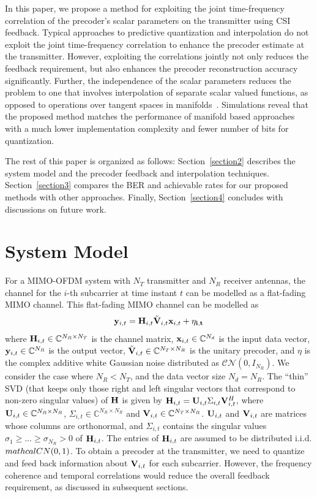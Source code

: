 \documentclass[journal,10pt,twocolumn]{IEEEtran}
\def\bx{{\bf x}}
\def\by{{\bf y}}
\def\bH{{\bf H}}
\def\bU{{\bf U}}
\def\bV{{\bf V}}
\begin{document}
In this paper, we propose a method for exploiting the joint
time-frequency correlation of the precoder's scalar parameters on the
transmitter using CSI feedback. Typical approaches to predictive
quantization and interpolation do not exploit the joint time-frequency
correlation to enhance the precoder estimate at the
transmitter. However, exploiting the correlations jointly not only
reduces the feedback requirement, but also enhances the precoder
reconstruction accuracy significantly. Further, the independence of
the scalar parameters reduces the problem to one that involves
interpolation of separate scalar valued functions, as opposed to
operations over tangent spaces in
manifolds~\cite{Gupt1905:Predictive}. Simulations reveal that the
proposed method matches the performance of manifold based approaches
with a much lower implementation complexity and fewer number of bits
for quantization.

The rest of this paper is organized as follows: Section~\ref{section2}
describes the system model and the precoder feedback and interpolation
techniques. Section~\ref{section3} compares the BER and achievable
rates for our proposed methods with other approaches. Finally,
Section~\ref{section4} concludes with discussions on future work.

\section{System Model}
For a MIMO-OFDM system with $N_T$ transmitter and $N_R$ receiver
antennas, the channel for the $i$-th subcarrier at time instant $t$
can be modelled as a flat-fading MIMO channel. This flat-fading MIMO
channel can be modelled as
\label{section2}
\begin{equation}
\by_{i,t} = \bH_{i,t}\tilde{\bV}_{i,t} \bx_{i,t}+ \bf{\eta_{i,t}}
\end{equation}
where $\bH_{i,t} \in \mathbb{C}^{N_R \times N_T}$ is the channel
matrix, $\bx_{i,t} \in \mathbb{C}^{N_d}$ is the input data vector,
$\by_{i,t} \in \mathbb{C}^{N_R}$ is the output vector,
$\tilde{\bV}_{i,t} \in \mathbb{C}^{N_T \times N_R}$ is the unitary
precoder, and $\eta$ is the complex additive white Gaussian noise
distributed as ${\mathcal{CN}}(0,I_{N_R})$. We consider the case where
$N_R < N_T$, and the data vector size $N_d = N_R$.  The ``thin'' SVD
(that keeps only those right and left singular vectors that correspond
to non-zero singular values) of $\bH$ is given by
$\bH_{i,t} = \bU_{i,t} \Sigma_{i,t} \bV_{i,t}^{H}$, where
$\bU_{i,t} \in \mathbb{C}^{N_R \times N_R}$,
$\Sigma_{i,t} \in \mathbb{C}^{N_R \times N_R}$ and
$\bV_{i,t} \in \mathbb{C}^{N_T \times N_R}$. $\bU_{i,t}$ and
$\bV_{i,t}$ are matrices whose columns are orthonormal, and
$\Sigma_{i,t}$ contains the singular values
$\sigma_1 \geq \ldots \geq \sigma_{N_R} > 0$ of $\bH_{i,t}$. The
entries of $\bH_{i,t}$ are assumed to be distributed
i.i.d. $\\mathcal{CN}(0,1)$. To obtain a precoder at the
transmitter, we need to quantize and feed back information about
$\bV_{i,t}$ for each subcarrier. However, the frequency coherence and
temporal correlations would reduce the overall feedback requirement,
as discussed in subsequent sections.
\end{document}
